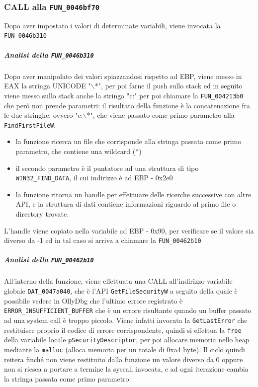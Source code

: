 \documentclass[12pt]{extarticle}
\begin{document}
\subsubsection{CALL alla \texttt{FUN\_0046bf70}} Dopo aver impostato i valori di determinate variabili, viene invocata la \texttt{FUN\_0046b310}\\
\subparagraph{Analisi della \texttt{FUN\_0046b310}} Dopo aver manipolato dei valori spiazzandosi rispetto ad EBP, viene messo in EAX la stringa UNICODE "$\backslash$*", per poi farne il push sullo stack ed in seguito viene messo sullo stack anche la stringa "c:" per poi chiamare la \texttt{FUN\_004213b0} che però non prende parametri: il risultato della funzione è la concatenazione fra le due stringhe, ovvero "c:$\backslash$*", che viene passato come primo parametro alla \texttt{FindFirstFileW}:
\begin{itemize}
    \item la funzione ricerca un file che corrisponde alla stringa passata come primo parametro, che contiene una wildcard (*)
    \item il secondo parametro è il puntatore ad una struttura di tipo \texttt{WIN32\_FIND\_DATA}, il cui indirizzo è ad EBP - 0x2e0
    \item la funzione ritorna un handle per effettuare delle ricerche successive con altre API, e la struttura di dati contiene informazioni riguardo al primo file o directory trovate.
\end{itemize}
L'handle viene copiato nella variabile ad EBP - 0x90, per verificare se il valore sia diverso da -1 ed in tal caso si arriva a chiamare la \texttt{FUN\_00462b10}\\
\subparagraph{Analisi della \texttt{FUN\_00462b10}} All'interno della funzione, viene effettuata una CALL all'indirizzo variabile globale \texttt{DAT\_0047a040}, che è l'API \texttt{GetFileSecurityW} a seguito della quale è possibile vedere in OllyDbg che l'ultimo errore registrato è \texttt{ERROR\_INSUFFICIENT\_BUFFER} che è un errore risultante quando un buffer passato ad una system call è troppo piccolo. Viene infatti invocata la \texttt{GetLastError} che restituisce proprio il codice di errore corrispondente, quindi si effettua la \texttt{free} della variabile locale \texttt{pSecurityDescriptor}, per poi allocare memoria nello heap mediante la \texttt{malloc} (alloca memoria per un totale di 0xa4 byte). Il ciclo quindi reitera finché non viene restituito dalla funzione un valore diverso da 0 oppure non si riesca a portare a termine la syscall invocata, e ad ogni iterazione cambia la stringa passata come primo parametro:
\end{document}
